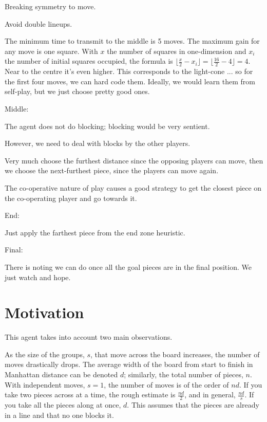 \documentclass[twocolumn]{article}
\begin{document}
Breaking symmetry to move.

Avoid double lineups.

The minimum time to transmit to the middle is 5 moves. The maximum gain for any move is one square. With $x$ the number of squares in one-dimension and $x_{i}$ the number of initial squares occupied, the formula is $\lfloor\frac{x}{2} - x_{i}\rfloor = \lfloor\frac{16}{2} - 4\rfloor = 4$. Near to the centre it's even higher. This corresponds to the light-cone ... so for the first four moves, we can hard code them. Ideally, we would learn them from self-play, but we just choose pretty good ones.

Middle:

The agent does not do blocking; blocking would be very sentient.

However, we need to deal with blocks by the other players.

Very much choose the furthest distance since the opposing players can move, then we choose the next-furthest piece, since the players can move again.

The co-operative nature of play causes a good strategy to get the closest piece on the co-operating player and go towards it.

End:

Just apply the farthest piece from the end zone heuristic.

Final:

There is noting we can do once all the goal pieces are in the final position. We just watch and hope.

\section{Motivation}


This agent takes into account two main observations.

As the size of the groups, $s$, that move across the board increases, the number of moves drastically drops. The average width of the board from start to finish in Manhattan distance can be denoted $d$; similarly, the total number of pieces, $n$. With independent moves, $s = 1$, the number of moves is of the order of $nd$. If you take two pieces across at a time, the rough estimate is $\frac{nd}{2}$, and in general, $\frac{nd}{s}$. If you take all the pieces along at once, $d$. This assumes that the pieces are already in a line and that no one blocks it.
\end{document}
